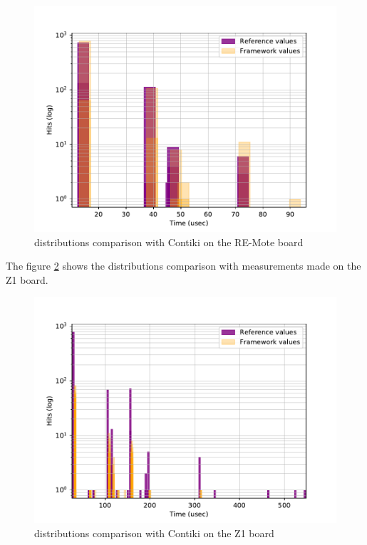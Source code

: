 \begin{figure}[!ht]
  \centering
  \includegraphics[scale=.7]{assets/comparison-devices-framework-contiki-remote.pdf}
  \caption{distributions comparison with Contiki on the RE-Mote board\label{fig:comparison-devices-framework-contiki-remote}}
\end{figure}

The figure \ref{fig:comparison-devices-framework-contiki-z1} shows the distributions comparison with measurements made on the Z1 board.

\begin{figure}[!ht]
  \centering
  \includegraphics[scale=.7]{assets/comparison-devices-framework-contiki-z1.pdf}
  \caption{distributions comparison with Contiki on the Z1 board\label{fig:comparison-devices-framework-contiki-z1}}
\end{figure}


